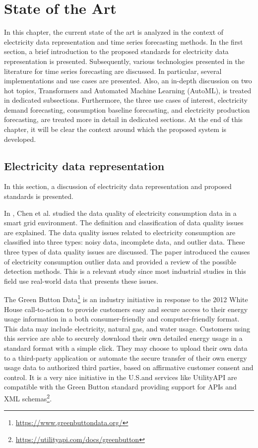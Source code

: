 \chapter{State of the Art}
\label{cha:soa}
\vspace{0.4 cm}

In this chapter, the current state of the art is analyzed in the context of electricity data representation and time series forecasting methods.
In the first section, a brief introduction to the proposed standards for electricity data representation is presented.
Subsequently, various technologies presented in the literature for time series forecasting are discussed.
In particular, several implementations and use cases are presented.
Also, an in-depth discussion on two hot topics, Transformers and Automated Machine Learning (AutoML), is treated in dedicated subsections.
Furthermore, the three use cases of interest, electricity demand forecasting, consumption baseline forecasting, and electricity production forecasting, are treated more in detail in dedicated sections.
At the end of this chapter, it will be clear the context around which the proposed system is developed.


\section{Electricity data representation}
\label{sec:data}
\vspace{0.2 cm}

In this section, a discussion of electricity data representation and proposed standards is presented.

In \cite{CHEN201798},  Chen et al. studied the data quality of electricity consumption data in a smart grid environment.
The definition and classification of data quality issues are explained.
The data quality issues related to electricity consumption are classified into three types: noisy data, incomplete data, and outlier data.
These three types of data quality issues are discussed.
The paper introduced the causes of electricity consumption outlier data and provided a review of the possible detection methods.
This is a relevant study since most industrial studies in this field use real-world data that presents these issues.

The Green Button Data\footnote{ \url{https://www.greenbuttondata.org/} } is an industry initiative in response to the 2012 White House call-to-action to provide customers easy and secure access to their energy usage information in a both consumer-friendly and computer-friendly format.
This data may include electricity, natural gas, and water usage.
Customers using this service are able to securely download their own detailed energy usage in a standard format with a simple click.
They may choose to upload their own data to a third-party application or automate the secure transfer of their own energy usage data to authorized third parties, based on affirmative customer consent and control.
It is a very nice initiative in the U.S.and services like UtilityAPI are compatible with the Green Button standard providing support for APIs and XML schemas\footnote{ \url{https://utilityapi.com/docs/greenbutton} }.

